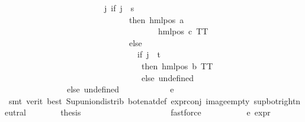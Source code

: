 \begin{isabellebody}
\ \ \ \ \ \ \ \ \ \ \ \ \ \ \ \ \ \ \ \ \ \ \ \ {\isacharparenleft}{\kern0pt}{\isasymlambda}j{\isachardot}{\kern0pt}\ {\isacharparenleft}{\kern0pt}if\ j\ {\isacharequal}{\kern0pt}\ s\ \isanewline
\ \ \ \ \ \ \ \ \ \ \ \ \ \ \ \ \ \ \ \ \ \ \ \ \ \ \ \ \ \ then\ {\isacharparenleft}{\kern0pt}hml{\isacharunderscore}{\kern0pt}pos\ a\ \isanewline
\ \ \ \ \ \ \ \ \ \ \ \ \ \ \ \ \ \ \ \ \ \ \ \ \ \ \ \ \ \ \ \ \ \ \ \ \ {\isacharparenleft}{\kern0pt}hml{\isacharunderscore}{\kern0pt}pos\ c\ TT{\isacharparenright}{\kern0pt}{\isacharparenright}{\kern0pt}\ \isanewline
\ \ \ \ \ \ \ \ \ \ \ \ \ \ \ \ \ \ \ \ \ \ \ \ \ \ \ \ \ \ else\ \isanewline
\ \ \ \ \ \ \ \ \ \ \ \ \ \ \ \ \ \ \ \ \ \ \ \ \ \ \ \ \ \ \ \ {\isacharparenleft}{\kern0pt}if\ j\ {\isacharequal}{\kern0pt}\ t\ \isanewline
\ \ \ \ \ \ \ \ \ \ \ \ \ \ \ \ \ \ \ \ \ \ \ \ \ \ \ \ \ \ \ \ \ then\ {\isacharparenleft}{\kern0pt}hml{\isacharunderscore}{\kern0pt}pos\ b\ TT{\isacharparenright}{\kern0pt}\ \isanewline
\ \ \ \ \ \ \ \ \ \ \ \ \ \ \ \ \ \ \ \ \ \ \ \ \ \ \ \ \ \ \ \ \ else\ undefined{\isacharparenright}{\kern0pt}{\isacharparenright}{\kern0pt}{\isacharparenright}{\kern0pt}{\isacharparenright}{\kern0pt}{\isacharparenright}{\kern0pt}\isanewline
\ \ \ \ \ \ \ \ \ \ \ \ \ \ \ else\ undefined{\isacharparenright}{\kern0pt}{\isacharparenright}{\kern0pt}{\isacharparenright}{\kern0pt}{\isacharparenright}{\kern0pt}\ {\isacharequal}{\kern0pt}\ {}{\isachardoublequoteclose}\isanewline
\ \ \ \ \ \ \ \ \isamarkupfalse%
\ e{}{\isacharunderscore}{\kern0pt}{}\isanewline
\ \ \ \ \ \ \ \ \isamarkupfalse%
\ {\isacharparenleft}{\kern0pt}smt\ {\isacharparenleft}{\kern0pt}verit{\isacharcomma}{\kern0pt}\ best{\isacharparenright}{\kern0pt}\ Sup{\isacharunderscore}{\kern0pt}union{\isacharunderscore}{\kern0pt}distrib\ bot{\isacharunderscore}{\kern0pt}enat{\isacharunderscore}{\kern0pt}def\ expr{\isacharunderscore}{\kern0pt}{}{\isacharunderscore}{\kern0pt}conj\ image{\isacharunderscore}{\kern0pt}empty\ sup{\isacharunderscore}{\kern0pt}bot{\isachardot}{\kern0pt}right{\isacharunderscore}{\kern0pt}neutral{\isacharparenright}{\kern0pt}\isanewline
\ \ \ \ \ \ \isamarkupfalse%
\ {\isacharquery}{\kern0pt}thesis\isanewline
\ \ \ \ \ \ \ \ \isamarkupfalse%
\ {\isasymphi}\ \isanewline
\ \ \ \ \ \ \ \ \isamarkupfalse%
\ fastforce\isanewline
\ \ \ \ \isamarkupfalse%
\isanewline
\isanewline
\ \ \ \ \isamarkupfalse%
\ e{}{\isacharcolon}{\kern0pt}\ {\isachardoublequoteopen}expr{\isacharunderscore}{\kern0pt}{}\ {\isasymphi}\ {\isacharequal}{\kern0pt}\ {}{\isachardoublequoteclose}\isanewline

\end{isabellebody}
